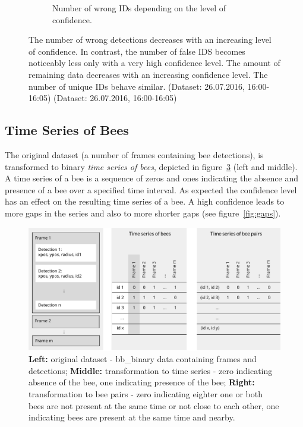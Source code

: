 \begin{figure}
\begin{subfigure}[b]{0.45\textwidth}
		\caption[Unique IDs]{Number of wrong IDs depending on the level of confidence.}
		\label{fig:confVSidsquality}
	\end{subfigure}
	\caption[Data Quality]{The number of wrong detections decreases with an increasing level of confidence. In contrast, the number of false IDS becomes noticeably less only with a very high confidence level. The amount of remaining data decreases with an increasing confidence level. The number of unique IDs behave similar. (Dataset: 26.07.2016, 16:00-16:05) (Dataset: 26.07.2016, 16:00-16:05)}
	\label{fig:quality}
\end{figure}


\subsection{Time Series of Bees}
\label{subsec:tracking}

The original dataset (a number of frames containing bee detections), is transformed to binary \emph{time series of bees}, depicted in figure~\ref{fig:structure} (left and middle). A time series of a bee is a sequence of zeros and ones indicating the absence and presence of a bee over a specified time interval. 
As expected the confidence level has an effect on the resulting time series of a bee. A high confidence leads to more gaps in the series and also to more shorter gaps (see figure~\ref{fig:gaps}).

\begin{figure}[htb]
	\centering
	\includegraphics[width=1.0\textwidth]{Figures/structure}
	\caption[Structure of Dataset]{\textbf{Left:} original dataset - bb\_binary data containing frames and detections; \textbf{Middle:} transformation to time series - zero indicating absence of the bee, one indicating presence of the bee; \textbf{Right:} transformation to bee pairs - zero indicating eighter one or both bees are not present at the same time or not close to each other, one indicating bees are present at the same time and nearby.}
	\label{fig:structure}
\end{figure}

